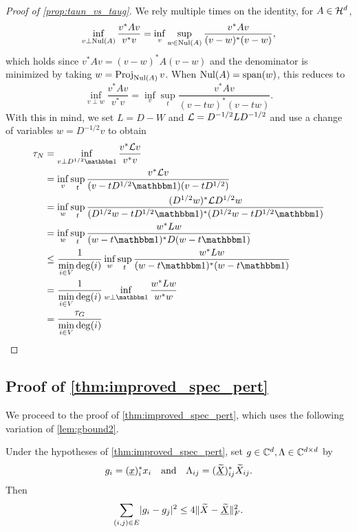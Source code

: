 \begin{proof}[Proof of \cref{prop:taun_vs_taug}]
  We rely multiple times on the identity, for $A \in \mathcal{H}^d$, \[\inf_{v \perp \operatorname{Nul}(A)} \dfrac{v^* A v}{v^* v} = \inf_v \sup_{w \in \operatorname{Nul}(A)} \dfrac{v^* A v}{(v - w)^*(v - w)},\] which holds since $v^* A v = (v - w)^* A (v - w)$ and the denominator is minimized by taking $w = \operatorname{Proj}_{\operatorname{Nul}(A)} v$.  When $\operatorname{Nul}(A) = \operatorname{span}(w)$, this reduces to \[\inf_{v \perp w} \dfrac{v^* A v}{v^* v} = \inf_v \sup_t \dfrac{v^* A v}{(v - t w)^* (v - t w)}.\]  With this in mind, we set $L = D - W$ and $\mathcal{L} = D^{-1/2} L D^{-1/2}$ and use a change of variables $w = D^{-1 / 2} v$ to obtain
  \begin{align*}
    \tau_N &= \inf_{v \perp D^{1 / 2} \one} \dfrac{v^* \Lc v}{v^* v} \\
    &= \inf_v \sup_t \dfrac{v^* \Lc v}{(v - t D^{1 / 2} \one)(v - t D^{1 /2})} \\
    &= \inf_w \sup_t \dfrac{(D^{1 / 2} w)^* \Lc D^{1 / 2} w}{(D^{1 / 2} w - t D^{1 / 2} \one)^* (D^{1 / 2} w - t D^{1 / 2} \one)} \\
    &= \inf_w \sup_t \dfrac{w^* L w}{(w - t \one)^* D (w - t \one)} \\
    &\le \dfrac{1}{\min\limits_{i \in V} \deg(i)} \inf_w \sup_t \dfrac{w^* L w}{(w - t \one)^* (w - t \one)} \\
    &= \dfrac{1}{\min\limits_{i \in V} \deg(i)} \inf_{w \perp \one} \dfrac{w^* L w}{w^* w} \\
    &= \dfrac{\tau_G}{\min\limits_{i \in V} \deg(i)}
  \end{align*}
\end{proof}



\subsection{Proof of \cref{thm:improved_spec_pert}}
We proceed to the proof of \cref{thm:improved_spec_pert}, which uses the following variation of \cref{lem:gbound2}.

\begin{lemma}
  Under the hypotheses of \cref{thm:improved_spec_pert}, set $g \in \mathbb{C}^d, \Lambda \in \mathbb{C}^{d \times d}$ by \[g_i = (\underline{x})^*_i x_i \quad \text{and} \quad \Lambda_{ij} = (\underline{\widetilde{X}})^*_{ij} \widetilde{X}_{ij}.\]  Then \[ \sum_{(i, j) \in E} \lvert g_i - g_j\rvert^2 \le 4 \lVert\widetilde{X} - \underline{\widetilde{X}}\rVert_F^2.\]
  \label{lem:gi_improved}
\end{lemma}

